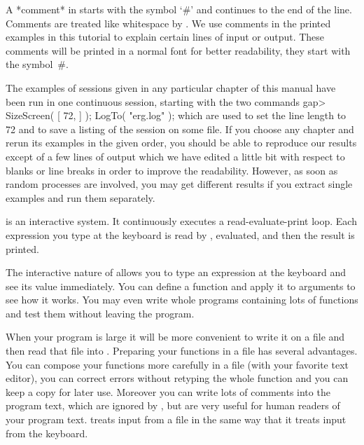 %
A *comment* in  {\GAP} starts with the  symbol `\#' and continues to  the
end of the line. Comments are  treated like whitespace  by {\GAP}. We use
comments in   the printed examples  in this  tutorial to  explain certain
lines of input or output. These comments will be printed in a normal font
for better readability, they start with the symbol~\#.

The examples of  {\GAP} sessions given  in any particular chapter of this
manual have been  run in one continuous   session, starting with the  two
commands
\begintt
    gap> SizeScreen( [ 72, ] ); LogTo( "erg.log" );
\endtt
which are used to set the line length to 72 and  to save a listing of the
session on some file.  If  you choose any chapter  and rerun its examples
in the given order, you should be able to reproduce our results except of
a few lines of output which we  have edited a  little bit with respect to
blanks or line  breaks in order to  improve the readability.  However, as
soon as  random processes are involved, you  may get different results if
you extract single examples and run them separately.

\null

%
{\GAP}  is  an   interactive   system.    It  continuously   executes   a
read-evaluate-print loop.  Each  expression you type  at the  keyboard is
read by {\GAP}, evaluated, and then the result is printed.

The interactive nature of {\GAP} allows you to type  an expression at the
keyboard and see its value immediately.  You can  define a  function  and
apply it to arguments  to  see how  it  works.  You may  even write whole
programs containing lots  of functions and test them without leaving  the
program.

When  your program is large it  will be more  convenient to write it on a
file and then read that file  into {\GAP}. Preparing  your functions in a
file   has  several advantages.  You  can   compose  your functions  more
carefully in a  file (with your favorite  text  editor), you can  correct
errors without retyping  the whole function and you  can keep a  copy for
later use. Moreover you can write lots of comments into the program text,
which are ignored  by {\GAP}, but are   very useful for  human readers of
your program text. {\GAP} treats  input from a  file in the same way that
it treats input from the keyboard.

